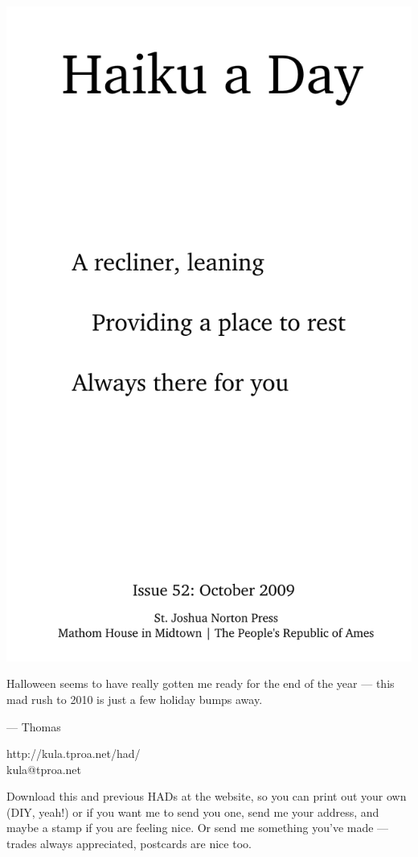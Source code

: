 \documentclass[12pt]{article}
\begin{document}
\includegraphics{frontpage.png}

\newpage


Halloween seems to have really gotten me ready for the 
end of the year --- this mad rush to 2010 is just a few
holiday bumps away. 

--- Thomas

http://kula.tproa.net/had/ \\
kula@tproa.net

Download this and previous HADs at the website, so you can
print out your own (DIY, yeah!) or if you want me to send
you one, send me your address, and maybe a stamp if you
are feeling nice. Or send me something you've made ---
trades always appreciated, postcards are nice too.
\end{document}
